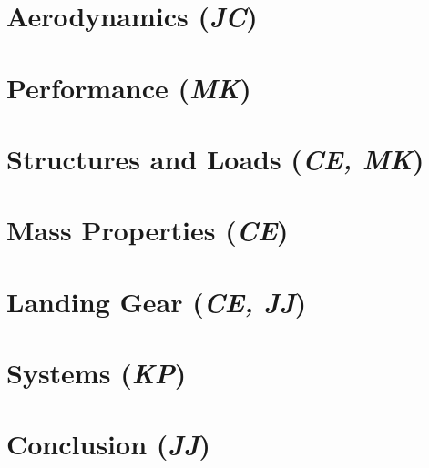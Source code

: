 \documentclass[conf]{new-aiaa}
\begin{document}
\clearpage
\section{Aerodynamics (\textit{JC})}
\label{section: Aerodynamics}


\clearpage
\section{Performance (\textit{MK})}
\label{section: Performance}


% 

\clearpage
\section{Structures and Loads (\textit{CE, MK})}
\label{section: Structures and Loads}


\clearpage
\section{Mass Properties (\textit{CE})}
\label{section: Mass Properties}


\clearpage
\section{Landing Gear (\textit{CE, JJ})}
\label{section: Landing Gear}


\clearpage
\section{Systems (\textit{KP})}
\label{section: Systems}


% 

\clearpage
\section{Conclusion (\textit{JJ})}
\label{section: Conclusion}



% 

\newpage

\end{document}
